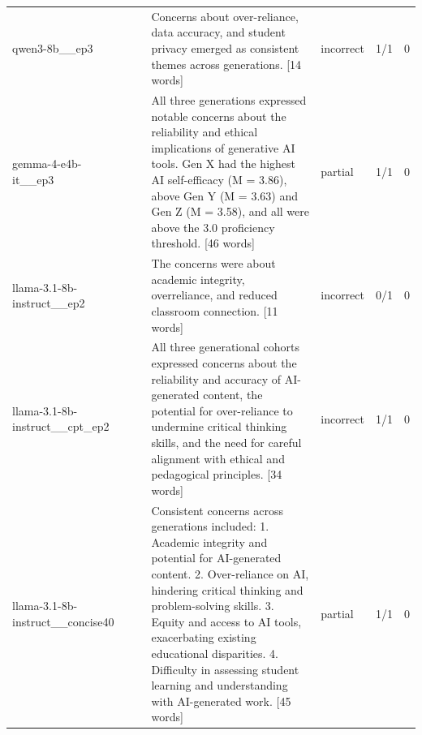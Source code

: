 \begin{longtable}{llllllr}
qwen3-8b\_\_ep3 &  &  & Concerns about over-reliance, data accuracy, and student privacy emerged as consistent themes across generations. [14 words] & incorrect & 1/1 & 0 \\
gemma-4-e4b-it\_\_ep3 &  &  & All three generations expressed notable concerns about the reliability and ethical implications of generative AI tools. Gen X had the highest AI self-efficacy (M = 3.86), above Gen Y (M = 3.63) and Gen Z (M = 3.58), and all were above the 3.0 proficiency threshold. [46 words] & partial & 1/1 & 0 \\
llama-3.1-8b-instruct\_\_ep2 &  &  & The concerns were about academic integrity, overreliance, and reduced classroom connection. [11 words] & incorrect & 0/1 & 0 \\
llama-3.1-8b-instruct\_\_cpt\_ep2 &  &  & All three generational cohorts expressed concerns about the reliability and accuracy of AI-generated content, the potential for over-reliance to undermine critical thinking skills, and the need for careful alignment with ethical and pedagogical principles. [34 words] & incorrect & 1/1 & 0 \\
llama-3.1-8b-instruct\_\_concise40 &  &  & Consistent concerns across generations included: 1. Academic integrity and potential for AI-generated content. 2. Over-reliance on AI, hindering critical thinking and problem-solving skills. 3. Equity and access to AI tools, exacerbating existing educational disparities. 4. Difficulty in assessing student learning and understanding with AI-generated work. [45 words] & partial & 1/1 & 0 \\
\end{longtable}


